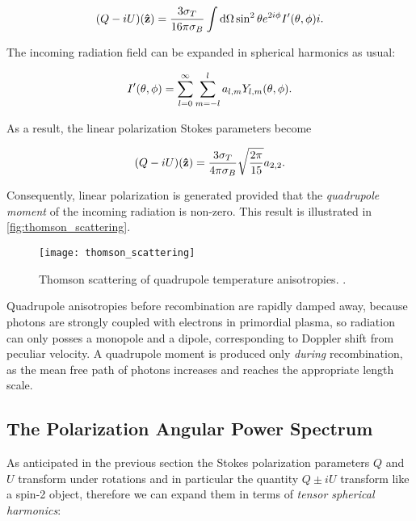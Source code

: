 \begin{equation}
        (Q -iU)\qty(\vectorunit{z}) = \frac{3\sigma_T}{16\pi \sigma_B}
        \int \dd{\Omega} \sin^2\theta e^{2i\phi}I'\qty(\theta,\phi)i.
\end{equation}

The incoming radiation field can be expanded in spherical harmonics as
usual:

\begin{equation}
        I'\qty(\theta,\phi) = \sum^\infty_{l = 0}\sum^l_{m = -l}
        a_{l,m} Y_{l,m}\qty(\theta,\phi).
\end{equation}

As a result, the linear polarization Stokes parameters become

\begin{equation}
        (Q - iU)\qty(\vectorunit{z}) = \frac{3\sigma_T}{4\pi\sigma_B}
        \sqrt{\frac{2\pi}{15}} a_{2,2}.
\end{equation}

Consequently, linear polarization is generated provided that the \emph{quadrupole
moment} of the incoming radiation is non-zero. This result is illustrated
in \autoref{fig:thomson_scattering}.

\begin{figure}
        \centering
        \texttt{[image: thomson\_scattering]}
        \caption{Thomson scattering of quadrupole temperature anisotropies.
        \autocite{hu1997cmb}.}
        \label{fig:thomson_scattering}
\end{figure}

Quadrupole anisotropies before recombination are rapidly damped away,
because photons are strongly coupled with electrons in primordial plasma, so
radiation can only posses a monopole and a dipole, corresponding to Doppler
shift from peculiar velocity. A quadrupole moment is produced only
\emph{during} recombination, as the mean free path of photons increases and
reaches the appropriate length scale.

\subsection{The Polarization Angular Power Spectrum}

As anticipated in the previous section the Stokes polarization parameters
$Q$ and $U$ transform under rotations and in particular the quantity $Q \pm
iU$ transform like a spin-2 object, therefore we can expand them in terms
of \emph{tensor spherical harmonics}:

